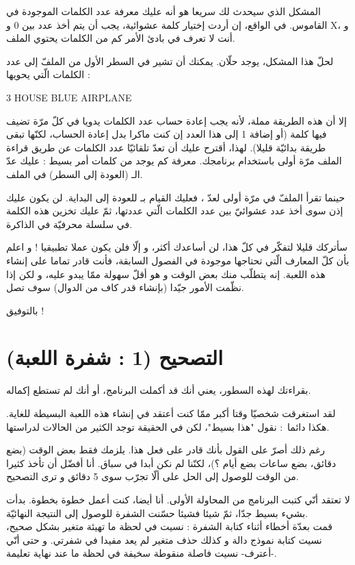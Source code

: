 المشكل الذي سيحدث لك سريعا هو أنه عليك معرفة عدد الكلمات الموجودة في القاموس. في الواقع، إن أردت إختيار كلمة عشوائية، يجب أن يتم أخذ عدد بين 0 و
\textenglish{X}،
و أنت لا تعرف في بادئ الأمر كم من الكلمات يحتوي الملف.

لحلّ هذا المشكل، يوجد حلّان. يمكنك أن تشير في السطر الأول من الملفّ إلى عدد الكلمات الّتي يحويها :

\begin{Console}
3
HOUSE
BLUE
AIRPLANE
\end{Console}

إلا أن هذه الطريقة مملة، لأنه يجب إعادة حساب عدد الكلمات يدويا في كلّ مرّة تضيف فيها كلمة (أو إضافة 1 إلى هذا العدد إن كنت ماكرا بدل إعادة الحساب، لكنّها تبقى طريقة بدائيّة قليلا). لهذا، أقترح عليك أن تعدّ تلقائيّا عدد الكلمات عن طريق قراءة الملف مرّة أولى باستخدام برنامجك. معرفة كم يوجد من كلمات أمر بسيط : عليك عدّ الـ
(العودة إلى السطر) في الملف.

حينما تقرأ الملفّ في مرّة أولى لعدّ
،
فعليك القيام بـ
للعودة إلى البداية. لن يكون عليك إذن سوى أخذ عدد عشوائيّ بين عدد الكلمات الّتي عددتها، ثمّ عليك تخزين هذه الكلمة في سلسلة محرفيّة في الذاكرة.

سأتركك قليلا لتفكّر في كلّ هذا، لن أساعدك أكثر، و إلّا فلن يكون عملا تطبيقيا ! و اعلم بأن  كلّ المعارف الّتي تحتاجها موجودة في الفصول السابقة، فأنت قادر تماما على إنشاء هذه اللعبة. إنه يتطلّب منك بعض الوقت و هو أقلّ سهولة ممّا يبدو عليه، و لكن إذا نظّمت الأمور جيّدا (بإنشاء قدر كاف من الدوال) سوف تصل.

بالتوفيق !

\section{التصحيح (1 : شفرة اللعبة)}

بقراءتك لهذه السطور، يعني أنك قد أكملت البرنامج، أو أنك لم تستطع إكماله.

لقد استغرقت شخصيّا وقتا أكبر ممّا كنت أعتقد في إنشاء هذه اللعبة البسيطة للغاية. هكذا دائما~: نقول "هذا بسيط"، لكن في الحقيقة توجد الكثير من الحالات لدراستها.

رغم ذلك أصرّ على القول بأنك قادر على فعل هذا. يلزمك فقط بعض الوقت (بضع دقائق، بضع ساعات بضع أيام ؟)، لكنّنا لم نكن أبدا في سباق. أنا أفضّل أن تأخذ كثيرا من الوقت للوصول إلى الحل على ألّا تجرّب سوى 5 دقائق و ترى التصحيح.

لا تعتقد أنّي كتبت البرنامج من المحاولة الأولى. أنا أيضا، كنت أعمل خطوة بخطوة. بدأت بشيء بسيط جدّا، ثمّ شيئا فشيئا حسّنت الشفرة للوصول إلى النتيجة النهائيّة.\\
قمت بعدّة أخطاء أثناء كتابة الشفرة : نسيت في لحظة ما تهيئة متغير بشكل صحيح، نسيت كتابة نموذج دالة و كذلك حذف متغير لم يعد مفيدا في شفرتي. و حتى أنّي -أعترف- نسيت فاصلة منقوطة سخيفة في لحظة ما عند نهاية تعليمة.

